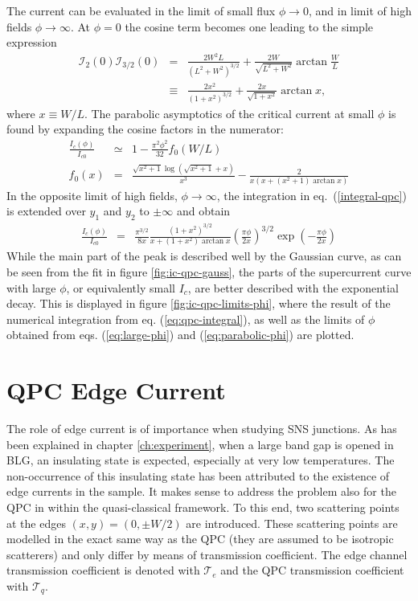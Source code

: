 The current can be evaluated in the limit of small flux $\phi \rightarrow 0$, and in limit of high fields $\phi \rightarrow \infty$. 
At $\phi=0$ the cosine term becomes one leading to the simple expression
\begin{eqnarray}
\mathcal{I}_2(0)\mathcal{I}_{3/2}(0) &=&
\frac{2 W^2 L}{\left( L^2 + W^2 \right)^{3/2}} + \frac{2W}{\sqrt{L^2 + W^2}} \arctan \frac{W}{L}  \\
&\equiv & \frac{2 x^2}{\left( 1 + x^2 \right)^{3/2}} + \frac{2 x}{\sqrt{1 + x^2} } \arctan x,
\label{Ic-0}
\end{eqnarray}
where $x \equiv W/L$.
The parabolic asymptotics of the critical current at small $\phi$ is found by expanding the cosine factors in the numerator:
\begin{eqnarray}
\frac{I_c(\phi)}{I_{c0}}&\simeq& 1 - \frac{\pi ^2 \phi^2 }{32} f_0(W/L) \\
f_0(x) &=& \frac{\sqrt{x^2+1} \log \left(\sqrt{x^2+1}+x\right)}{x^3} - \frac{2}{x (x+(x^2+1) \arctan x)}\label{eq:parabolic-phi} 
\end{eqnarray}
In the opposite limit of high fields, $\phi\to \infty$, the integration in eq.~(\ref{integral-qpc}) is extended over $y_1$ and $y_2$ to $\pm \infty$ and obtain
\begin{eqnarray}
\frac{I_c(\phi)}{I_{c0}} &=& \frac{\pi^{3/2}}{8 x} \frac{(1 + x^2)^{3/2}}{x + (1+x^2) \arctan x} \left( \frac{\pi \phi}{2 x} \right)^{3/2} \exp \left( - \frac{\pi \phi}{2 x} \right)
\label{eq:large-phi}
\end{eqnarray}
While the main part of the peak is described well by the Gaussian curve, as can be seen from the fit in figure \ref{fig:ic-qpc-gauss}, the parts of the supercurrent curve with large $\phi$, or equivalently small $I_c$, are better described with the exponential decay. This is displayed in figure \ref{fig:ic-qpc-limits-phi}, where the result of the numerical integration from eq. (\ref{eq:qpc-integral}), as well as the limits of $\phi$ obtained from eqs. (\ref{eq:large-phi}) and (\ref{eq:parabolic-phi}) are plotted.  

\section{QPC Edge Current}
The role of edge current is of importance when studying SNS junctions. As has been explained in chapter \ref{ch:experiment}, when a large band gap is opened in BLG, an insulating state is expected, especially at very low temperatures. The non-occurrence of this insulating state has been attributed to the existence of edge currents in the sample. It makes sense to address the problem also for the QPC in within the quasi-classical framework. To this end, two scattering points at the edges $(x, y) = (0, \pm W/2)$ are introduced. These scattering points are modelled in the exact same way as the QPC (they are assumed to be isotropic scatterers) and only differ by means of transmission coefficient. The edge channel transmission coefficient is denoted with $\mathcal{T}_e$ and the QPC transmission coefficient with $\mathcal{T}_q$. 


